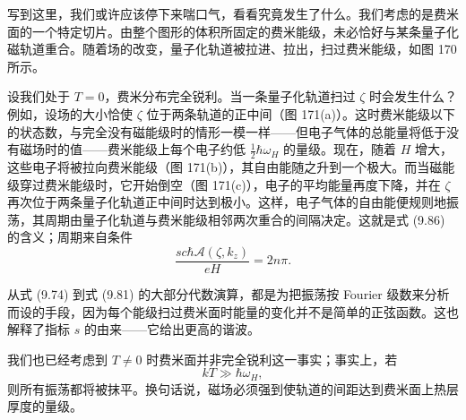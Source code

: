 写到这里，我们或许应该停下来喘口气，看看究竟发生了什么。我们考虑的是费米面的一个特定切片。由整个图形的体积所固定的费米能级，未必恰好与某条量子化磁轨道重合。随着场的改变，量子化轨道被拉进、拉出，扫过费米能级，如图 170 所示。



设我们处于 $T=0$，费米分布完全锐利。当一条量子化轨道扫过 $\zeta$ 时会发生什么？例如，设场的大小恰使 $\zeta$ 位于两条轨道的正中间（图 171(a)）。这时费米能级以下的状态数，与完全没有磁能级时的情形一模一样——但电子气体的总能量将低于没有磁场时的值——费米能级上每个电子约低 $\frac{1}{2}\hbar\omega_{H}$ 的量级。现在，随着 $H$ 增大，这些电子将被拉向费米能级（图 171(b)），其自由能随之升到一个极大。而当磁能级穿过费米能级时，它开始倒空（图 171(c)），电子的平均能量再度下降，并在 $\zeta$ 再次位于两条量子化轨道正中间时达到极小。这样，电子气体的自由能便规则地振荡，其周期由量子化轨道与费米能级相邻两次重合的间隔决定。这就是式 (9.86) 的含义；周期来自条件
\begin{equation*}
\frac{sc\hbar\mathcal{A}(\zeta,k_{z})}{eH}=2n\pi.
\tag{9.87}
\end{equation*}

从式 (9.74) 到式 (9.81) 的大部分代数演算，都是为把振荡按 Fourier 级数来分析而设的手段，因为每个能级扫过费米面时能量的变化并不是简单的正弦函数。这也解释了指标 $s$ 的由来——它给出更高的谐波。

我们也已经考虑到 $T\neq 0$ 时费米面并非完全锐利这一事实；事实上，若
\begin{equation*}
kT\gg\hbar\omega_{H},
\tag{9.88}
\end{equation*}
则所有振荡都将被抹平。换句话说，磁场必须强到使轨道的间距达到费米面上热层厚度的量级。

